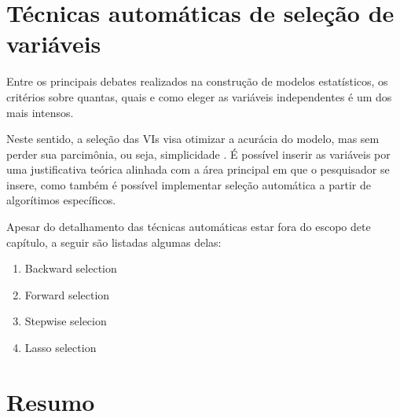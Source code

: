 \documentclass[
]{book}
\providecommand{\tightlist}{%
  \setlength{\itemsep}{0pt}\setlength{\parskip}{0pt}}
\begin{document}
\hypertarget{tuxe9cnicas-automuxe1ticas-de-seleuxe7uxe3o-de-variuxe1veis}{%
\section{Técnicas automáticas de seleção de variáveis}\label{tuxe9cnicas-automuxe1ticas-de-seleuxe7uxe3o-de-variuxe1veis}}

Entre os principais debates realizados na construção de modelos estatísticos, os critérios sobre quantas, quais e como eleger as variáveis independentes é um dos mais intensos.

Neste sentido, a seleção das VIs visa otimizar a acurácia do modelo, mas sem perder sua parcimônia, ou seja, simplicidade \citep{Unger1973, Gaudio2001}. É possível inserir as variáveis por uma justificativa teórica alinhada com a área principal em que o pesquisador se insere, como também é possível implementar seleção automática a partir de algorítimos específicos.

Apesar do detalhamento das técnicas automáticas estar fora do escopo dete capítulo, a seguir são listadas algumas delas:

\begin{enumerate}
\def\labelenumi{\arabic{enumi}.}
\tightlist
\item
  Backward selection\\
\item
  Forward selection\\
\item
  Stepwise selecion\\
\item
  Lasso selection
\end{enumerate}

\hypertarget{resumo-13}{%
\section{Resumo}\label{resumo-13}}
\end{document}
